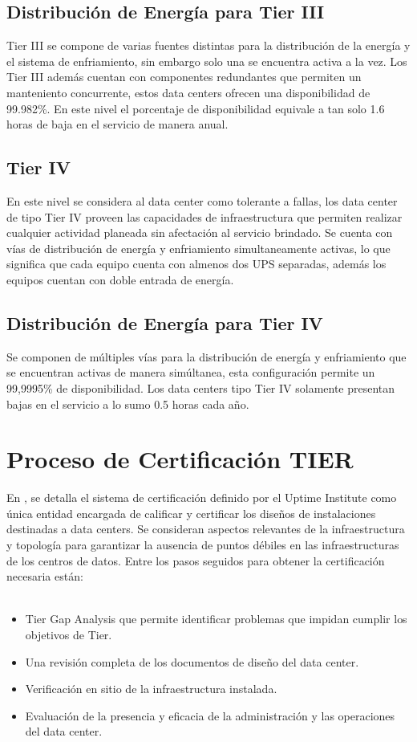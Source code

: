 \documentclass[journal]{IEEEtran}
\begin{document}
\subsection{Distribución de Energía para Tier III}
Tier III se compone de varias fuentes distintas para la distribución de la energía y el sistema de enfriamiento, sin embargo solo una se encuentra activa a la vez. Los Tier III además cuentan con componentes redundantes que permiten
un manteniento concurrente, estos data centers ofrecen una disponibilidad de 99.982\%. En este nivel el porcentaje de disponibilidad equivale a tan solo 1.6 horas de baja en el servicio de manera anual.
\subsection{Tier IV}
En este nivel se considera al data center como tolerante a fallas, los data center de tipo Tier IV proveen las capacidades de infraestructura que permiten realizar cualquier actividad planeada sin afectación al servicio 
brindado. Se cuenta con vías de distribución de energía y enfriamiento simultaneamente activas, lo que significa que cada equipo cuenta con almenos dos UPS separadas, además los equipos cuentan con doble entrada de energía.
\subsection{Distribución de Energía para Tier IV}
Se componen de múltiples vías para la distribución de energía y enfriamiento que se encuentran activas de manera simúltanea, esta configuración permite un 99,9995\% de disponibilidad. Los data centers tipo Tier IV solamente presentan bajas en el servicio a lo sumo 0.5 horas cada año.
\section{Proceso de Certificación TIER}
En \cite{george}, se detalla el sistema de certificación definido por el Uptime Institute como única entidad encargada de calificar y certificar los diseños de instalaciones destinadas a data centers. 
Se consideran aspectos relevantes de la infraestructura y topología para garantizar la ausencia de puntos débiles en las infraestructuras de los centros de datos.
Entre los pasos seguidos para obtener la certificación necesaria están:
\\
\\
\begin{itemize}
  \item Tier Gap Analysis que permite identificar problemas que impidan cumplir los objetivos de Tier.
  \item Una revisión completa de los documentos de diseño del data center.
  \item Verificación en sitio de la infraestructura instalada.
  \item Evaluación de la presencia y eficacia de la administración y las operaciones del data center.
\end{itemize}
\end{document}
